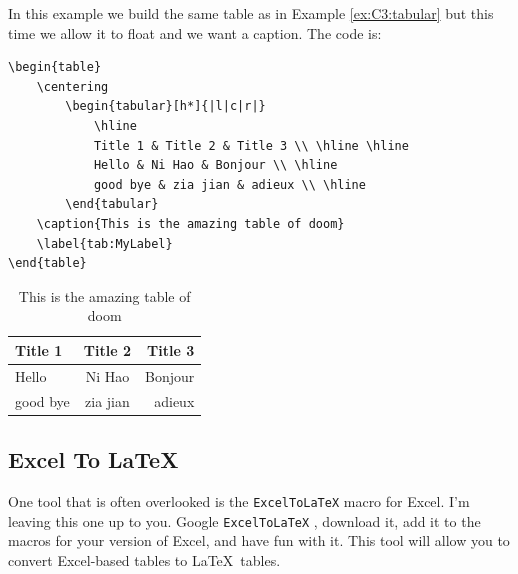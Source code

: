 \begin{example}\label{ex:C3:table} In this example we build the same table as in Example
    \ref{ex:C3:tabular} but this time we allow it to float and we want a caption.  The
    code is:   
\begin{verbatim}
\begin{table}
    \centering
        \begin{tabular}[h*]{|l|c|r|}
            \hline
            Title 1 & Title 2 & Title 3 \\ \hline \hline
            Hello & Ni Hao & Bonjour \\ \hline
            good bye & zia jian & adieux \\ \hline
        \end{tabular}
    \caption{This is the amazing table of doom}
    \label{tab:MyLabel}
\end{table}
\end{verbatim}
\end{example}
    \begin{table}
        \begin{center}
            \begin{tabular}[h*]{|l|c|r|}
                \hline
                Title 1 & Title 2 & Title 3 \\ \hline \hline
                Hello & Ni Hao & Bonjour \\ \hline
                good bye & zia jian & adieux \\ \hline
            \end{tabular}
        \end{center}
        \caption{This is the amazing table of doom}
        \label{tab:MyLabel}
    \end{table}



\subsection{Excel To \LaTeX}
One tool that is often overlooked is the \texttt{ExcelToLaTeX} macro for Excel.  I'm
leaving this one up to you.  Google \texttt{ExcelToLaTeX} , download
it, add it to the macros for your version of Excel, and have fun with it.  This tool will
allow you to convert Excel-based tables to \LaTeX\ tables.





